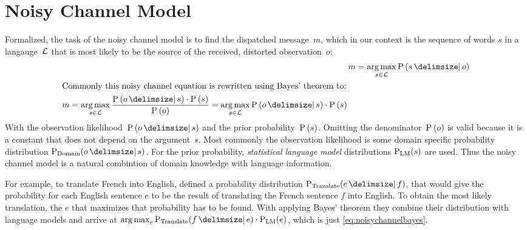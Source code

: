 \section{Noisy Channel Model}

Formalized, the task of the noisy channel model is to find the dispatched
message~$m$, which in our context is the sequence of words $s$ in a
langauge~$\mathcal{L}$ that is most likely to be the source of the received,
distorted observation~$o$:
\begin{align}
  \label{eq:noisychannel}
  m &= \Argmax{s \in \Language} \Prob{s}{o} \\
  \intertext{Commonly this noisy channel equation is rewritten using Bayes'
    theorem to:}
  \label{eq:noisychannelbayes}
  \begin{split}
    m &= \Argmax{s \in \Language} \frac{\Prob{o}{s} \cdot \Prob{s}}{\Prob{o}}
       = \Argmax{s \in \Language} \Prob{o}{s} \cdot \Prob{s}
  \end{split}
\end{align}
With the observation likelihood~$\Prob{o}{s}$ and the prior
probability~$\Prob{s}$.
Omitting the denominator~$\Prob{o}$ is valid because it is a constant that does
not depend on the argument~$s$.
Most commonly the observation likelihood is some domain specific probability
distribution $\Prob[\text{Domain}]{o}{s}$.
For the prior probability, \emph{statistical language model} distributions
$\Prob[\text{LM}]{s}$ are used.
Thus the noisy channel model is a natural combintion of domain knowledge with
language information.

For example, to translate French into English, \textcite{Brown1990} defined a
probability distribution $\Prob[\text{Translate}]{e}{f}$, that would give the
probability for each English sentence $e$ to be the result of translating
the French sentence $f$ into English.
To obtain the most likely translation, the $e$ that maximizes that probability
has to be found.
With applying Bayes' theorem they combine their distribution with language
models and arrive at
$\Argmax{e} \Prob[\text{Translate}]{f}{e} \cdot \Prob[\text{LM}]{e}$, which is
just \cref{eq:noisychannelbayes}.

